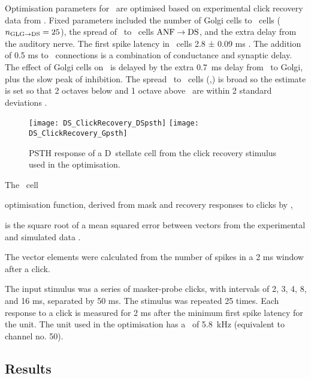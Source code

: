 % 


Optimisation parameters for \GLGDS~are optimised based on experimental click
recovery data from \citep{BackoffPalombiEtAl:1997}.  Fixed parameters included
the number of Golgi cells to \DS~cells ($\protect n_{\protect\textrm{{GLG}}\to\textrm{{DS}}} = 25$), the spread of \ANFs~to
\DS~cells $\protect\textrm{{ANF}}\to\textrm{{DS}}$, and the extra delay from the auditory nerve.  The first
spike latency in \DS~cells 2.8 ± 0.09 ms \citep{RhodeSmith:1986}. The addition of
0.5 ms to \ANFDS~connections is a combination of conductance and synaptic
delay. The effect of Golgi cells on \DS~is delayed by the extra 0.7~ms delay
from \ANF~to Golgi, plus the slow peak of \GABAa inhibition.  The spread \ANF~to
\DS~cells (\sANFDSh,\sANFDSl) is broad so the
estimate is set so that 2 octaves below and 1 octave above \CF~are within 2
standard deviations \citep{PaoliniClark:1999}.


 \begin{figure}[htb]
   \centering
\texttt{[image: DS\_ClickRecovery\_DSpsth]}%
\texttt{[image: DS\_ClickRecovery\_Gpsth]}%
   \caption[PSTH response to click recovery stimulus]{PSTH response of a D~stellate cell from the click recovery stimulus
   used in the optimisation.}\label{fig:ClickExamples}
 \end{figure}


The \DS~cell 

optimisation function, derived from mask and recovery responses to
clicks by \citet{BackoffPalombiEtAl:1997}, 


 is the square root of a mean squared error between vectors from the
experimental and simulated data . 

The vector elements were calculated from the
number of spikes in a 2 ms window after a click.  

The input stimulus was a series of masker-probe clicks, with intervals of 2, 3,
4, 8, and 16 ms, separated by 50 ms. The stimulus was repeated 25 times. Each
response to a click is measured for 2 ms after the minimum first spike latency
for the unit.  The unit used in the optimisation has a \CF~of 5.8~kHz
(equivalent to channel no. 50).


\subsection{Results}    \label{sec:DS:results}



